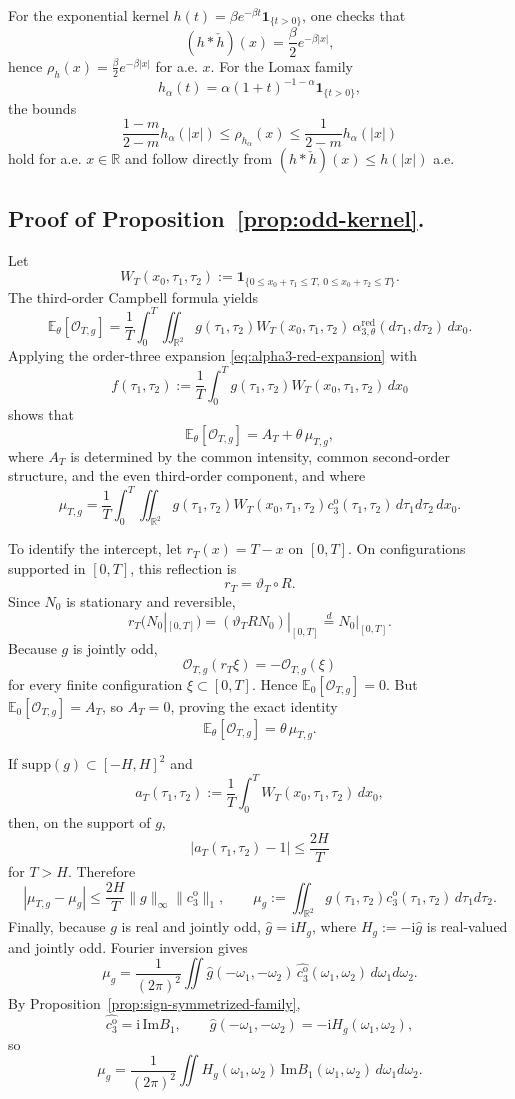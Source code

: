 \documentclass[aap,press]{apt} \volno{00} \partno{00}
\newcommand{\E}{\mathbb{E}}
\newcommand{\R}{\mathbb{R}}
\renewcommand{\ii}{\mathrm{i}}
\newcommand{\1}{\mathbf{1}}
\newcommand{\Imm}{\mathrm{Im}}
\numberwithin{equation}{section}
\begin{document}
For the exponential kernel $h(t)=\beta e^{-\beta t}\1_{\{t>0\}}$, one checks that
\[
(h*\check h)(x)=\frac{\beta}{2}e^{-\beta|x|},
\]
hence $\rho_h(x)=\frac{\beta}{2}e^{-\beta|x|}$ for a.e. $x$. For the Lomax family
\[
h_\alpha(t)=\alpha(1+t)^{-1-\alpha}\1_{\{t>0\}},
\]
the bounds
\[
\frac{1-m}{2-m}h_\alpha(|x|)\le \rho_{h_\alpha}(x)\le \frac{1}{2-m}h_\alpha(|x|)
\]
hold for a.e. $x\in\R$ and follow directly from $(h*\check h)(x)\le h(|x|)$ a.e.

\subsection{Proof of Proposition~\ref{prop:odd-kernel}.}
Let
\[
W_T(x_0,\tau_1,\tau_2):=\1_{\{0\le x_0+\tau_1\le T,\ 0\le x_0+\tau_2\le T\}}.
\]
The third-order Campbell formula yields
\[
\E_\theta[\mathcal O_{T,g}]
=
\frac{1}{T}\int_0^T\iint_{\R^2}
g(\tau_1,\tau_2)W_T(x_0,\tau_1,\tau_2)\,
\alpha_{3,\theta}^{\mathrm{red}}(d\tau_1,d\tau_2)\,dx_0.
\]
Applying the order-three expansion \eqref{eq:alpha3-red-expansion} with
\[
f(\tau_1,\tau_2):=\frac{1}{T}\int_0^T g(\tau_1,\tau_2)W_T(x_0,\tau_1,\tau_2)\,dx_0
\]
shows that
\[
\E_\theta[\mathcal O_{T,g}]=A_T+\theta\,\mu_{T,g},
\]
where $A_T$ is determined by the common intensity, common second-order structure, and the even third-order component, and where
\[
\mu_{T,g}
=
\frac{1}{T}\int_0^T\iint_{\R^2}
g(\tau_1,\tau_2)W_T(x_0,\tau_1,\tau_2)c_3^{\mathrm o}(\tau_1,\tau_2)\,d\tau_1d\tau_2\,dx_0.
\]

To identify the intercept, let $r_T(x)=T-x$ on $[0,T]$. On configurations supported in $[0,T]$, this reflection is
\[
r_T=\vartheta_T\circ R.
\]
Since $N_0$ is stationary and reversible,
\[
r_T(N_0|_{[0,T]})
=
(\vartheta_T RN_0)|_{[0,T]}
\stackrel d=
N_0|_{[0,T]}.
\]
Because $g$ is jointly odd,
\[
\mathcal O_{T,g}(r_T\xi)=-\mathcal O_{T,g}(\xi)
\]
for every finite configuration $\xi\subset[0,T]$. Hence $\E_0[\mathcal O_{T,g}]=0$. But $\E_0[\mathcal O_{T,g}]=A_T$, so $A_T=0$, proving the exact identity
\[
\E_\theta[\mathcal O_{T,g}]=\theta\,\mu_{T,g}.
\]

If $\mathrm{supp}(g)\subset[-H,H]^2$ and
\[
a_T(\tau_1,\tau_2):=\frac1T\int_0^T W_T(x_0,\tau_1,\tau_2)\,dx_0,
\]
then, on the support of $g$,
\[
|a_T(\tau_1,\tau_2)-1|\le \frac{2H}{T}
\]
for $T>H$. Therefore
\[
|\mu_{T,g}-\mu_g|
\le \frac{2H}{T}\|g\|_\infty\|c_3^{\mathrm o}\|_1,
\qquad
\mu_g:=\iint_{\R^2}g(\tau_1,\tau_2)c_3^{\mathrm o}(\tau_1,\tau_2)\,d\tau_1d\tau_2.
\]
Finally, because $g$ is real and jointly odd, $\widehat g=\ii H_g$, where $H_g:=-\ii\widehat g$ is real-valued and jointly odd. Fourier inversion gives
\[
\mu_g
=
\frac{1}{(2\pi)^2}\iint \widehat g(-\omega_1,-\omega_2)\,\widehat{c_3^{\mathrm o}}(\omega_1,\omega_2)\,d\omega_1d\omega_2.
\]
By Proposition~\ref{prop:sign-symmetrized-family},
\[
\widehat{c_3^{\mathrm o}}=\ii\,\Imm B_1,
\qquad
\widehat g(-\omega_1,-\omega_2)=-\ii H_g(\omega_1,\omega_2),
\]
so
\[
\mu_g
=
\frac{1}{(2\pi)^2}\iint H_g(\omega_1,\omega_2)\,\Imm B_1(\omega_1,\omega_2)\,d\omega_1d\omega_2.
\]
\end{document}
